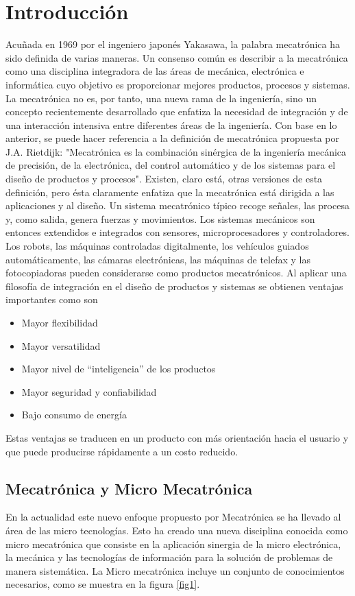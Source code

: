 \documentclass[12pt]{book}
\theoremstyle{definition}
\theoremstyle{remark}
\theoremstyle{plain}
\begin{document}
\chapter{Introducción}
Acuñada en 1969 por el ingeniero japonés Yakasawa, la palabra mecatrónica ha sido definida de varias maneras. Un consenso común es describir a la mecatrónica como una disciplina integradora de las áreas de mecánica, electrónica e informática cuyo objetivo es proporcionar mejores productos, procesos y sistemas. La mecatrónica no es, por tanto, una nueva rama de la ingeniería, sino un concepto recientemente desarrollado que enfatiza la necesidad de integración y de una interacción intensiva entre diferentes áreas de la ingeniería.
Con base en lo anterior, se puede hacer referencia a la definición de mecatrónica propuesta por J.A. Rietdijk: "Mecatrónica es la combinación sinérgica de la ingeniería mecánica de precisión, de la electrónica, del control automático y de los sistemas para el diseño de productos y procesos". Existen, claro está, otras versiones de esta definición, pero ésta claramente enfatiza que la mecatrónica está dirigida a las aplicaciones y al diseño.
Un sistema mecatrónico típico recoge señales, las procesa y, como salida, genera fuerzas y movimientos. Los sistemas mecánicos son entonces extendidos e integrados con sensores, microprocesadores y controladores. Los robots, las máquinas controladas digitalmente, los vehículos guiados automáticamente, las cámaras electrónicas, las máquinas de telefax y las fotocopiadoras pueden considerarse como productos mecatrónicos. Al aplicar una filosofía de integración en el diseño de productos y sistemas se obtienen ventajas importantes como son
\begin{itemize}
\item  Mayor flexibilidad
\item  Mayor versatilidad
\item Mayor nivel de “inteligencia” de los productos
\item Mayor seguridad y confiabilidad
\item Bajo consumo de energía
\end{itemize}

Estas ventajas se traducen en un producto con más orientación hacia el usuario y que puede producirse rápidamente a un costo reducido.

\section{Mecatrónica y Micro Mecatrónica}
En la actualidad este nuevo enfoque propuesto por Mecatrónica se ha llevado al área de las micro tecnologías. Esto ha creado una nueva disciplina conocida como micro mecatrónica que consiste en la aplicación sinergia de la micro electrónica, la mecánica y las tecnologías de información para la solución de problemas de manera sistemática. La Micro mecatrónica incluye un conjunto de conocimientos necesarios, como se muestra en la figura \ref{fig1}.
\end{document}
